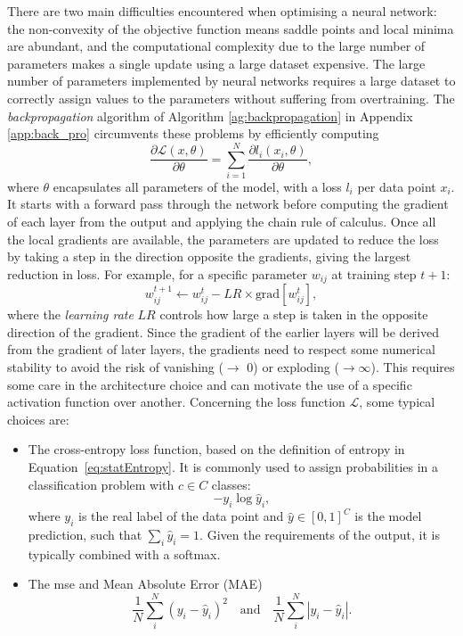 There are two main difficulties encountered when optimising a neural network: the non-convexity of the objective function means saddle points and local minima are abundant, and the computational complexity due to the large number of parameters makes a single update using a large dataset expensive. The large number of parameters implemented by neural networks requires a large dataset to correctly assign values to the parameters without suffering from overtraining. The \textit{backpropagation} algorithm of Algorithm \ref{ag:backpropagation} in Appendix \ref{app:back_pro} circumvents these problems \cite{backprop} by efficiently computing \[ \frac{\partial\mathcal{L}(x, \theta)}{\partial\theta} = \sum_{i=1}^N \frac{\partial l_i(x_i, \theta)}{\partial\theta},\] where $\theta$ encapsulates all parameters of the model, with a loss $l_i$ per data point $x_i$. It starts with a forward pass through the network before computing the gradient of each layer from the output and applying the chain rule of calculus. Once all the local gradients are available, the parameters are updated to reduce the loss by taking a step in the direction opposite the gradients, giving the largest reduction in loss. For example, for a specific parameter $w_{ij}$ at training step $t+1$:
\begin{equation}\label{eq:gradientdescent}
    w^{t+1}_{ij} \leftarrow w^{t}_{ij} - LR \times \text{grad}\left[w^{t}_{ij}\right],
\end{equation}
where the \textit{learning rate} $LR$ controls how large a step is taken in the opposite direction of the gradient. Since the gradient of the earlier layers will be derived from the gradient of later layers, the gradients need to respect some numerical stability to avoid the risk of vanishing ($\rightarrow$ 0) or exploding ($\rightarrow \infty$). This requires some care in the architecture choice and can motivate the use of a specific activation function over another. Concerning the loss function $\mathcal{L}$, some typical choices are:
\begin{itemize}
    \item The cross-entropy loss function, based on the definition of entropy in Equation~\ref{eq:statEntropy}. It is commonly used to assign probabilities in a classification problem with $c \in C$ classes: \[ -y_i \log\hat{y}_i,\] where $y_i$ is the real label of the data point and $\hat{y} \in [0, 1]^C$ is the model prediction, such that $\sum_i \hat{y}_i = 1$. Given the requirements of the output, it is typically combined with a softmax. 
    \item The \gls{mse} and Mean Absolute Error (MAE) \[\frac{1}{N}\sum_i^N (y_i - \hat{y}_i)^2 \quad \text{and} \quad \frac{1}{N}\sum_i^N |y_i - \hat{y}_i|.\] 
\end{itemize} 

